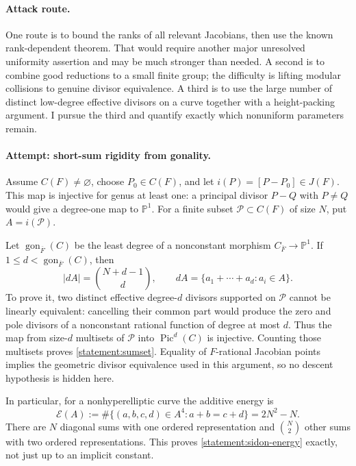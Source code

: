 \documentclass[11pt,a4paper]{article}
\newcommand{\PP}{\mathbb P}
\numberwithin{equation}{section}
\begin{document}
\paragraph{Attack route.}
One route is to bound the ranks of all relevant Jacobians, then use the
known rank-dependent theorem. That would require another major unresolved
uniformity assertion and may be much stronger than needed. A second is
to combine good reductions to a small finite group; the difficulty is
lifting modular collisions to genuine divisor equivalence. A third is
to use the large number of distinct low-degree effective divisors on a
curve together with a height-packing argument. I pursue the third and
quantify exactly which nonuniform parameters remain.

\paragraph{Attempt: short-sum rigidity from gonality.}
Assume $C(F)\ne\varnothing$, choose $P_0\in C(F)$, and let
$i(P)=[P-P_0]\in J(F)$. This map is injective for genus at least one:
a principal divisor $P-Q$ with $P\ne Q$ would give a degree-one map to
$\PP^1$. For a finite subset $\mathcal P\subset C(F)$ of size $N$, put
$A=i(\mathcal P)$.

Let $\operatorname{gon}_{\overline F}(C)$ be the least degree of a
nonconstant morphism $C_{\overline F}\to\PP^1$. If
$1\le d<\operatorname{gon}_{\overline F}(C)$, then
\begin{equation}\label{statement:sumset}
 |dA|=\binom{N+d-1}{d},
 \qquad dA=\{a_1+\cdots+a_d:a_i\in A\}.
\end{equation}
To prove it, two distinct effective degree-$d$ divisors supported on
$\mathcal P$ cannot be linearly equivalent: cancelling their common
part would produce the zero and pole divisors of a nonconstant rational
function of degree at most $d$. Thus the map from size-$d$ multisets of
$\mathcal P$ into $\operatorname{Pic}^d(C)$ is injective. Counting those
multisets proves \eqref{statement:sumset}. Equality of $F$-rational Jacobian
points implies the geometric divisor equivalence used in this argument,
so no descent hypothesis is hidden here.

In particular, for a nonhyperelliptic curve the additive energy is
\begin{equation}\label{statement:sidon-energy}
 \mathcal E(A):=\#\{(a,b,c,d)\in A^4:a+b=c+d\}=2N^2-N.
\end{equation}
There are $N$ diagonal sums with one ordered representation and
$\binom N2$ other sums with two ordered representations. This proves
\eqref{statement:sidon-energy} exactly, not just up to an implicit constant.
\end{document}
